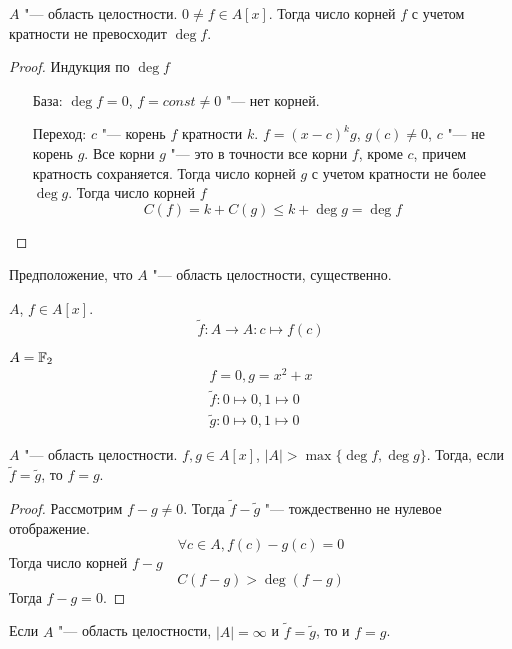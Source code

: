 \begin{theorem}{}
$A$ "--- область целостности. $0 \ne f \in A[x]$. Тогда число корней $f$ с учетом кратности не превосходит $\deg f$.
\end{theorem}
\begin{proof}
Индукция по $\deg f$
\begin{itemize}
\item[База:] 
$\deg f = 0$, $f = const \ne 0$ "--- нет корней.
\item[Переход:] 
$c$ "--- корень $f$ кратности $k$. $f = (x - c)^{k}g$, $g(c) \ne 0$, $c$ "--- не корень $g$.
Все корни $g$ "--- это в точности все корни $f$, кроме $c$, причем кратность сохраняется. Тогда число корней $g$ с учетом кратности не более $\deg g$. Тогда число корней $f$ 
\[ C(f) = k + C(g) \le k + \deg g = \deg f \]
\end{itemize}
\end{proof}

\begin{Rem}
Предположение, что $A$ "--- область целостности, существенно.
\end{Rem}

\begin{Def}
$A$, $f \in A[x]$.
\[ \tilde f\colon A \to A\colon c \mapsto f(c) \]
\end{Def}
\begin{exmp}
$A = \mathbb{F}_2$
\begin{gather*}
f = 0, g = x^2 + x \\
\tilde f\colon 0 \mapsto 0, 1 \mapsto 0 \\
\tilde g\colon 0 \mapsto 0, 1 \mapsto 0
\end{gather*}
\end{exmp}

\begin{conseq}
$A$ "--- область целостности. $f, g \in A[x]$, $|A| > \max\{\deg f, \deg g\}$.
Тогда, если $\tilde f = \tilde g$, то $f = g$.
\end{conseq}
\begin{proof}
Рассмотрим $f - g \ne 0$. Тогда $\tilde f - \tilde g$ "--- тождественно не нулевое отображение.
\[ \forall c \in A, f(c) - g(c) = 0 \]
Тогда число корней $f - g$
\[ C(f-g) > \deg (f - g) \]
Тогда $f - g = 0$.
\end{proof}

\begin{conseq}
Если $A$ "--- область целостности, $|A| = \infty$ и $\tilde f = \tilde g$, то и $f = g$.
\end{conseq}